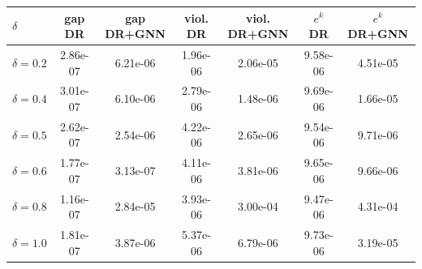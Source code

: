 
\begin{tabular}{lcccccc}
\toprule
$\delta$ & gap DR & gap DR+GNN & viol. DR & viol. DR+GNN & $e^k$ DR & $e^k$ DR+GNN \\
\midrule
$\delta=0.2$ & 2.86e-07 & 6.21e-06 & 1.96e-06 & 2.06e-05 & 9.58e-06 & 4.51e-05 \\
$\delta=0.4$ & 3.01e-07 & 6.10e-06 & 2.79e-06 & 1.48e-06 & 9.69e-06 & 1.66e-05 \\
$\delta=0.5$ & 2.62e-07 & 2.54e-06 & 4.22e-06 & 2.65e-06 & 9.54e-06 & 9.71e-06 \\
$\delta=0.6$ & 1.77e-07 & 3.13e-07 & 4.11e-06 & 3.81e-06 & 9.65e-06 & 9.66e-06 \\
$\delta=0.8$ & 1.16e-07 & 2.84e-05 & 3.93e-06 & 3.00e-04 & 9.47e-06 & 4.31e-04 \\
$\delta=1.0$ & 1.81e-07 & 3.87e-06 & 5.37e-06 & 6.79e-06 & 9.73e-06 & 3.19e-05 \\
\bottomrule
\end{tabular}
